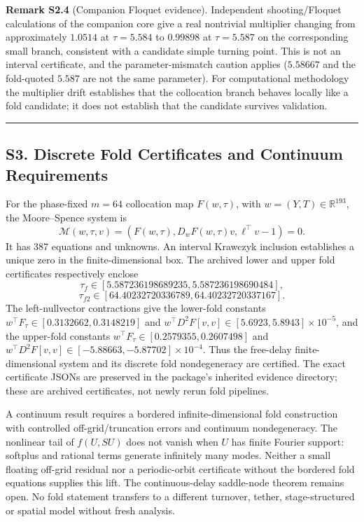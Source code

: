 \documentclass[
  10pt,
  a4paper,
]{article}
\begin{document}
\textbf{Remark S2.4} (Companion Floquet evidence). Independent
shooting/Floquet calculations of the companion core give a real
nontrivial multiplier changing from approximately \(1.0514\) at
\(\tau = 5.584\) to \(0.99898\) at \(\tau = 5.587\) on the corresponding
small branch, consistent with a candidate simple turning point. This is
not an interval certificate, and the parameter-mismatch caution applies
(\(5.58667\) and the fold-quoted \(5.587\) are not the same parameter).
For computational methodology the multiplier drift establishes that the
collocation branch behaves locally like a fold candidate; it does not
establish that the candidate survives validation.

\begin{center}\rule{0.5\linewidth}{0.5pt}\end{center}

\subsection{S3. Discrete Fold Certificates and Continuum
Requirements}\label{s3.-discrete-fold-certificates-and-continuum-requirements}

For the phase-fixed \(m=64\) collocation map \(F(w,\tau)\), with
\(w=(Y,T)\in\mathbb R^{193}\), the Moore--Spence system is
\[\mathcal M(w,\tau,v)=(F(w,\tau),D_wF(w,\tau)v,\ell^\top v-1)=0.\] It
has 387 equations and unknowns. An interval Krawczyk inclusion
establishes a unique zero in the finite-dimensional box. The archived
lower and upper fold certificates respectively enclose
\[\tau_f\in[5.587236198689235,5.587236198690484],\]
\[\tau_{f2}\in[64.40232720336789,64.40232720337167].\] The
left-nullvector contractions give the lower-fold constants
\(w^\top F_\tau\in[0.3132662,0.3148219]\) and
\(w^\top D^2F[v,v]\in[5.6923,5.8943]\times10^{-5}\), and the upper-fold
constants \(w^\top F_\tau\in[0.2579355,0.2607498]\) and
\(w^\top D^2F[v,v]\in[-5.88663,-5.87702]\times10^{-4}\). Thus the
free-delay finite-dimensional system and its discrete fold nondegeneracy
are certified. The exact certificate JSONs are preserved in the
package's inherited evidence directory; these are archived certificates,
not newly rerun fold pipelines.

A continuum result requires a bordered infinite-dimensional fold
construction with controlled off-grid/truncation errors and continuum
nondegeneracy. The nonlinear tail of \(f(U,SU)\) does not vanish when
\(U\) has finite Fourier support: softplus and rational terms generate
infinitely many modes. Neither a small floating off-grid residual nor a
periodic-orbit certificate without the bordered fold equations supplies
this lift. The continuous-delay saddle-node theorem remains open. No
fold statement transfers to a different turnover, tether,
stage-structured or spatial model without fresh analysis.
\end{document}
